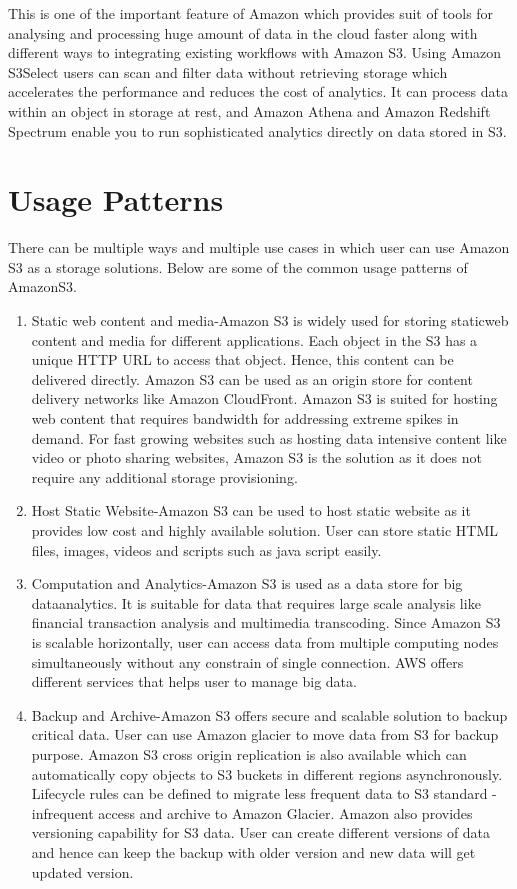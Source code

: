 This is one of the important feature of Amazon which provides suit of tools for
analysing and processing huge amount of data in the cloud faster along with
different ways to integrating existing workflows with Amazon S3. Using Amazon
S3Select users can scan and filter data without retrieving storage which
accelerates the performance and reduces the cost of analytics. It can process
data within an object in storage at rest, and Amazon Athena and Amazon Redshift
Spectrum enable you to run sophisticated analytics directly on data stored in
S3.

\section{Usage Patterns}
There can be multiple ways and multiple use cases in which user can use Amazon
S3 as a storage solutions. Below are some of the common usage patterns of
AmazonS3.
\begin{enumerate}
\item Static web content and media-Amazon S3 is widely used for storing
staticweb content and media for different applications. Each object in the S3
has a
unique HTTP URL to access that object. Hence, this content can be delivered
directly. Amazon S3 can be
used as an origin store for content delivery networks like Amazon CloudFront.
Amazon S3 is suited for hosting web content that requires bandwidth for
addressing extreme spikes in demand. For fast growing websites such as hosting
data intensive content like video or photo sharing websites, Amazon S3 is the
solution as it does not require any additional storage provisioning.
 
\item Host Static Website-Amazon S3 can be used to host static website as it
provides low cost and highly available solution. User can store static HTML
files, images, videos and scripts such as java script easily.

\item Computation and Analytics-Amazon S3 is used as a data store for big
dataanalytics. It is suitable for data that requires large scale analysis like
financial transaction analysis and multimedia transcoding. Since Amazon S3 is
scalable horizontally, user can access data from multiple computing nodes
simultaneously without any constrain of single connection. AWS offers different
services that helps user to manage big data.

\item Backup and Archive-Amazon S3 offers secure and scalable solution to
backup critical data. User can use Amazon glacier to move data from S3 for
backup purpose. Amazon S3 cross origin replication is also available which can
automatically copy objects to S3 buckets in different regions asynchronously.
Lifecycle rules can be defined to migrate less frequent data to S3 standard -
infrequent access and archive to Amazon Glacier. Amazon also provides
versioning capability for S3 data. User can create different versions of data
and hence can keep the backup with older version and new data will get updated
version.
\end{enumerate}

